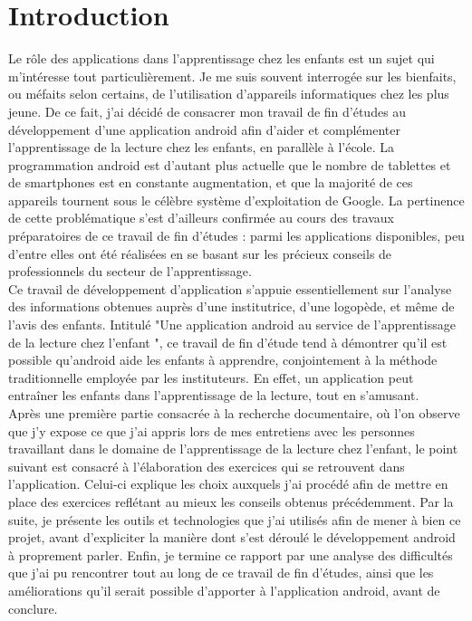 \section{Introduction}
Le rôle des applications dans l'apprentissage chez les enfants est un sujet qui m'intéresse tout particulièrement. Je me suis souvent interrogée sur les bienfaits, ou méfaits selon certains, de l'utilisation d'appareils informatiques chez les plus jeune. De ce fait, j'ai décidé de consacrer mon travail de fin d'études au développement d'une application android afin d'aider et complémenter l'apprentissage de la lecture chez les enfants, en parallèle à l'école. La programmation android est d'autant plus actuelle que le nombre de tablettes et de smartphones est en constante augmentation, et que la majorité de ces appareils tournent sous le célèbre système d'exploitation de Google. La pertinence de cette problématique s'est d'ailleurs confirmée au cours des travaux préparatoires de ce travail de fin d'études : parmi les applications disponibles, peu d'entre elles ont été réalisées en se basant sur les précieux conseils de professionnels du secteur de l'apprentissage.\\

Ce travail de développement d'application s'appuie essentiellement sur l'analyse des informations obtenues auprès d'une institutrice, d'une logopède, et même de l'avis des enfants. Intitulé "Une application android au service de l'apprentissage de la lecture chez l'enfant ", ce travail de fin d'étude tend à démontrer qu'il est possible qu'android aide les enfants à apprendre, conjointement à la méthode traditionnelle employée par les instituteurs. En effet, un application peut entraîner les enfants dans l'apprentissage de la lecture, tout en s'amusant.\\

Après une première partie consacrée à la recherche documentaire, où l'on observe que j'y expose ce que j'ai appris lors de mes entretiens avec les personnes travaillant dans le domaine de l'apprentissage de la lecture chez l'enfant, le point suivant est consacré à l'élaboration des exercices qui se retrouvent dans l'application. Celui-ci explique les choix auxquels j'ai procédé afin de mettre en place des exercices reflétant au mieux les conseils obtenus précédemment. Par la suite, je présente les outils et technologies que j'ai utilisés afin de mener à bien ce projet, avant d'expliciter la manière dont s'est déroulé le développement android à proprement parler. Enfin, je termine ce rapport par une analyse des difficultés que j'ai pu rencontrer tout au long de ce travail de fin d'études, ainsi que les améliorations qu'il serait possible d'apporter à l'application android, avant de conclure.
